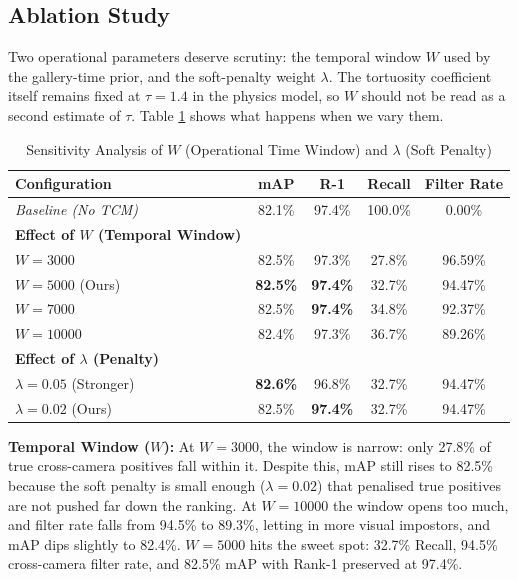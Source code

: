 \documentclass{ijitcs}
\newcommand{\rev}[1]{#1}
\begin{document}
\subsection{Ablation Study}
\label{sec:ablation}
\rev{Two operational parameters deserve scrutiny: the temporal window $W$ used by the gallery-time prior, and the soft-penalty weight $\lambda$. The tortuosity coefficient itself remains fixed at $\tau=1.4$ in the physics model, so $W$ should not be read as a second estimate of $\tau$.} Table \ref{tab:ablation} shows what happens when we vary them.

\begin{table}[htbp]
\caption{\rev{Sensitivity Analysis of $W$ (Operational Time Window) and $\lambda$ (Soft Penalty)}}
\begin{center}
\begin{tabular}{lcccc}
\toprule
\textbf{Configuration} & \textbf{mAP} & \textbf{R-1} & \textbf{Recall} & \textbf{Filter Rate} \\
\midrule
\textit{Baseline (No TCM)} & 82.1\% & 97.4\% & 100.0\% & 0.00\% \\
\midrule
\textbf{Effect of $W$ (Temporal Window)} & & & & \\
$W=3000$ & 82.5\% & 97.3\% & 27.8\% & 96.59\% \\
$W=5000$ (Ours) & \textbf{82.5\%} & \textbf{97.4\%} & 32.7\% & 94.47\% \\
$W=7000$ & 82.5\% & \textbf{97.4\%} & 34.8\% & 92.37\% \\
$W=10000$ & 82.4\% & 97.3\% & 36.7\% & 89.26\% \\
\midrule
\textbf{Effect of $\lambda$ (Penalty)} & & & & \\
$\lambda=0.05$ (Stronger) & \textbf{82.6\%} & 96.8\% & 32.7\% & 94.47\% \\
$\lambda=0.02$ (Ours) & 82.5\% & \textbf{97.4\%} & 32.7\% & 94.47\% \\
\bottomrule
\end{tabular}
\label{tab:ablation}
\end{center}
\end{table}

\textbf{Temporal Window ($W$):} At $W=3000$, the window is narrow: only 27.8\% of true cross-camera positives fall within it. Despite this, mAP still rises to 82.5\% because the soft penalty is small enough ($\lambda=0.02$) that penalised true positives are not pushed far down the ranking. At $W=10000$ the window opens too much, and filter rate falls from 94.5\% to 89.3\%, letting in more visual impostors, and mAP dips slightly to 82.4\%. $W=5000$ hits the sweet spot: 32.7\% Recall, 94.5\% cross-camera filter rate, and 82.5\% mAP with Rank-1 preserved at 97.4\%.
\end{document}
